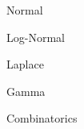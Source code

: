 \documentclass[11pt]{article}
\begin{document}
\begin{enumerate}
\begin{item}
\begin{enumerate}
\begin{item}
\begin{enumerate}
\begin{item}
\begin{enumerate}
                      \begin{item}
                        Normal
                      \end{item}

                      \begin{item}
                        Log-Normal
                      \end{item}

                      \begin{item}
                        Laplace
                      \end{item}

                      \begin{item}
                        Gamma
                      \end{item}

                  \end{enumerate}

                \end{item}

            \end{enumerate}

          \end{item}

          \begin{item}
            Combinatorics
          \end{item}

      \end{enumerate}

    \end{item}

\end{enumerate}
\fi
\end{document}
